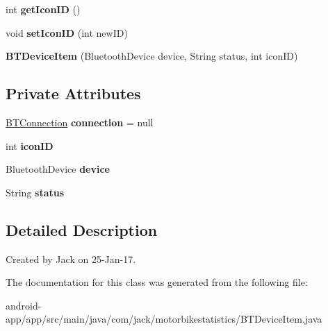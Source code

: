 \begin{DoxyCompactItemize}
int {\bfseries get\+Icon\+ID} ()
\item 
\mbox{\label{classcom_1_1jack_1_1motorbikestatistics_1_1_b_t_device_item_a40eb2a1f46700690d2327bf37bc5ed0e}} 
void {\bfseries set\+Icon\+ID} (int new\+ID)
\item 
\mbox{\label{classcom_1_1jack_1_1motorbikestatistics_1_1_b_t_device_item_addc508fe41b31b9e13a9105464a627ac}} 
{\bfseries B\+T\+Device\+Item} (Bluetooth\+Device device, String status, int icon\+ID)
\end{DoxyCompactItemize}
\subsection*{Private Attributes}
\begin{DoxyCompactItemize}
\item 
\mbox{\label{classcom_1_1jack_1_1motorbikestatistics_1_1_b_t_device_item_a38830528ad49afd7ba09ced7ab55d6dc}} 
\hyperlink{classcom_1_1jack_1_1motorbikestatistics_1_1_b_t_connection}{B\+T\+Connection} {\bfseries connection} = null
\item 
\mbox{\label{classcom_1_1jack_1_1motorbikestatistics_1_1_b_t_device_item_a77f7a3c228f87fa5e946fe77b310f805}} 
int {\bfseries icon\+ID}
\item 
\mbox{\label{classcom_1_1jack_1_1motorbikestatistics_1_1_b_t_device_item_acd943b008d77dcb5d72f8a65fa4986b9}} 
Bluetooth\+Device {\bfseries device}
\item 
\mbox{\label{classcom_1_1jack_1_1motorbikestatistics_1_1_b_t_device_item_ae7a8756973644c5719d5faddf3fa7946}} 
String {\bfseries status}
\end{DoxyCompactItemize}


\subsection{Detailed Description}
Created by Jack on 25-\/\+Jan-\/17. 

The documentation for this class was generated from the following file\+:\begin{DoxyCompactItemize}
\item 
android-\/app/app/src/main/java/com/jack/motorbikestatistics/B\+T\+Device\+Item.\+java\end{DoxyCompactItemize}
